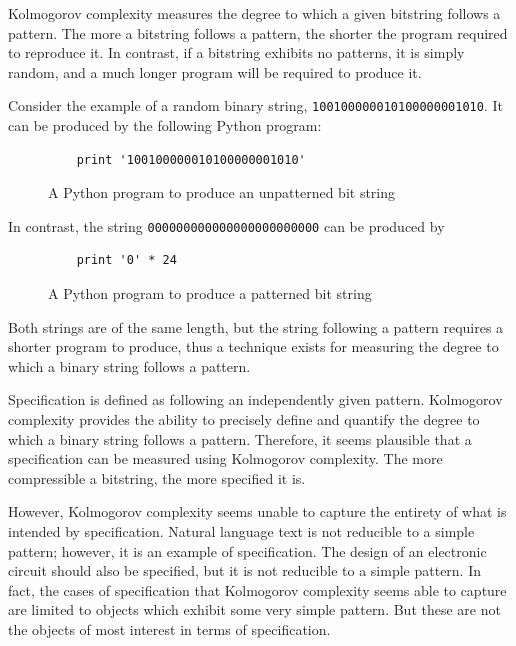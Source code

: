 Kolmogorov complexity measures the degree to which a given bitstring follows a pattern.
The more a bitstring follows a pattern, the shorter the program required to reproduce it.
In contrast, if a bitstring exhibits no patterns, it is simply random, and a much longer program will be required to produce it.

Consider the example of a random binary string, {\tt 100100000010100000001010}.
It can be produced by the following Python program:

\begin{figure}[H]
\begin{mdframed}
\begin{verbatim}
    print '100100000010100000001010'
\end{verbatim}
\end{mdframed}
\caption{A Python program to produce an unpatterned bit string}
\end{figure}

In contrast, the string {\tt 000000000000000000000000} can be produced by

\begin{figure}[H]
\begin{mdframed}
\begin{verbatim}
    print '0' * 24
\end{verbatim}
\end{mdframed}
\caption{A Python program to produce a patterned bit string}
\end{figure}

Both strings are of the same length, but the string following a pattern requires a shorter program to produce,
thus a technique exists for measuring the degree to which a binary string follows a pattern.

Specification is defined as following an independently given pattern.
Kolmogorov complexity provides the ability to precisely define and quantify the degree to which a binary string follows a pattern.
Therefore, it seems plausible that a specification can be measured using Kolmogorov complexity.
The more compressible a bitstring, the more specified it is.

However, Kolmogorov complexity seems unable to capture the entirety of what is intended by specification.
Natural language text is not reducible to a simple pattern; however, it is an example of specification.
The design of an electronic circuit should also be specified, but it is not reducible to a simple pattern.
In fact, the cases of specification that Kolmogorov complexity seems able to capture are limited to objects which exhibit some very simple pattern.
But these are not the objects of most interest in terms of specification.

